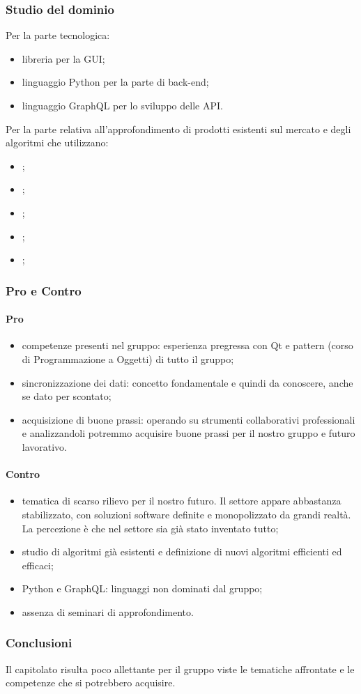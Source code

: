 \subsubsection{Studio del dominio}
Per la parte tecnologica:
\begin{itemize}
	\item libreria  per la GUI;
	\item linguaggio Python per la parte di back-end;
	\item linguaggio GraphQL per lo sviluppo delle API.
\end{itemize} 

Per la parte relativa all'approfondimento di prodotti esistenti sul mercato e degli algoritmi che utilizzano:
\begin{itemize}
	\item {};
	\item {};
	\item {};
	\item {};
	\item {};
\end{itemize} 
\subsubsection{Pro e Contro}
\paragraph*{Pro}
\begin{itemize}
	\item competenze presenti nel gruppo: esperienza pregressa con Qt e pattern  (corso di Programmazione a Oggetti) di tutto il gruppo;
	\item sincronizzazione dei dati: concetto fondamentale e quindi da conoscere, anche se dato per scontato;
	\item acquisizione di buone prassi: operando su strumenti collaborativi professionali e analizzandoli potremmo acquisire buone prassi per il nostro gruppo e futuro lavorativo.	
\end{itemize}
\paragraph*{Contro}
\begin{itemize}
	\item tematica di scarso rilievo per il nostro futuro. Il settore appare abbastanza stabilizzato, con soluzioni software definite e monopolizzato da grandi realtà. La percezione è che nel settore sia già stato inventato tutto;
	\item studio di algoritmi già esistenti e definizione di nuovi algoritmi efficienti ed efficaci;
	\item Python e GraphQL: linguaggi non dominati dal gruppo;
	\item assenza di seminari di approfondimento.
\end{itemize}
\subsubsection{Conclusioni}
Il capitolato risulta poco allettante per il gruppo viste le tematiche affrontate e le competenze che si potrebbero acquisire.